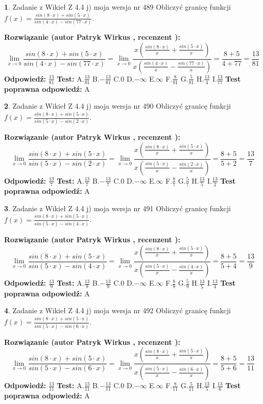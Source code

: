 \documentclass[12pt, a4paper]{article}
\theoremstyle{definition} %
\newtheorem{zad}{}
\newcommand{\zadStart}[1]{\begin{zad}#1\newline}
\newcommand{\zadStop}{\end{zad}}
\newcommand{\rozwStart}[2]{\noindent \textbf{Rozwiązanie (autor #1 , recenzent #2): }\newline}
\newcommand{\rozwStop}{\newline}
\newcommand{\odpStart}{\noindent \textbf{Odpowiedź:}\newline}
\newcommand{\odpStop}{\newline}
\newcommand{\testStart}{\noindent \textbf{Test:}\newline}
\newcommand{\testStop}{\newline}
\newcommand{\kluczStart}{\noindent \textbf{Test poprawna odpowiedź:}\newline}
\newcommand{\kluczStop}{\newline}
\begin{document}
\zadStart{Zadanie z Wikieł Z 4.4 j) moja wersja nr 489}
Obliczyć granicę funkcji $f(x)=\frac{sin(8\cdot x) +sin(5\cdot x)}{sin(4\cdot x) -sin(77\cdot x)}$.
\zadStop
\rozwStart{Patryk Wirkus}{}
$$\lim\limits_{x\to 0}\frac{sin(8\cdot x) +sin(5\cdot x)}{sin(4\cdot x) -sin(77\cdot x)}=\lim\limits_{x\to 0}\frac{x(\frac{sin(8\cdot x)}{x}+\frac{sin(5\cdot x)}{x})}{x(\frac{sin(4\cdot x)}{x}-\frac{sin(77\cdot x)}{x})}=\frac{8+5}{4+77} = \frac{13}{81}$$
\rozwStop
\odpStart
$\frac{13}{81}$
\odpStop
\testStart
A.$\frac{13}{81}$
B.$-\frac{13}{81}$
C.$0$
D.$-\infty$
E.$\infty$
F.$\frac{8}{81}$
G.$\frac{5}{81}$
H.$\frac{13}{4}$
I.$\frac{13}{77}$
\testStop
\kluczStart
A
\kluczStop



\zadStart{Zadanie z Wikieł Z 4.4 j) moja wersja nr 490}
Obliczyć granicę funkcji $f(x)=\frac{sin(8\cdot x) +sin(5\cdot x)}{sin(5\cdot x) -sin(2\cdot x)}$.
\zadStop
\rozwStart{Patryk Wirkus}{}
$$\lim\limits_{x\to 0}\frac{sin(8\cdot x) +sin(5\cdot x)}{sin(5\cdot x) -sin(2\cdot x)}=\lim\limits_{x\to 0}\frac{x(\frac{sin(8\cdot x)}{x}+\frac{sin(5\cdot x)}{x})}{x(\frac{sin(5\cdot x)}{x}-\frac{sin(2\cdot x)}{x})}=\frac{8+5}{5+2} = \frac{13}{7}$$
\rozwStop
\odpStart
$\frac{13}{7}$
\odpStop
\testStart
A.$\frac{13}{7}$
B.$-\frac{13}{7}$
C.$0$
D.$-\infty$
E.$\infty$
F.$\frac{8}{7}$
G.$\frac{5}{7}$
H.$\frac{13}{5}$
I.$\frac{13}{2}$
\testStop
\kluczStart
A
\kluczStop



\zadStart{Zadanie z Wikieł Z 4.4 j) moja wersja nr 491}
Obliczyć granicę funkcji $f(x)=\frac{sin(8\cdot x) +sin(5\cdot x)}{sin(5\cdot x) -sin(4\cdot x)}$.
\zadStop
\rozwStart{Patryk Wirkus}{}
$$\lim\limits_{x\to 0}\frac{sin(8\cdot x) +sin(5\cdot x)}{sin(5\cdot x) -sin(4\cdot x)}=\lim\limits_{x\to 0}\frac{x(\frac{sin(8\cdot x)}{x}+\frac{sin(5\cdot x)}{x})}{x(\frac{sin(5\cdot x)}{x}-\frac{sin(4\cdot x)}{x})}=\frac{8+5}{5+4} = \frac{13}{9}$$
\rozwStop
\odpStart
$\frac{13}{9}$
\odpStop
\testStart
A.$\frac{13}{9}$
B.$-\frac{13}{9}$
C.$0$
D.$-\infty$
E.$\infty$
F.$\frac{8}{9}$
G.$\frac{5}{9}$
H.$\frac{13}{5}$
I.$\frac{13}{4}$
\testStop
\kluczStart
A
\kluczStop



\zadStart{Zadanie z Wikieł Z 4.4 j) moja wersja nr 492}
Obliczyć granicę funkcji $f(x)=\frac{sin(8\cdot x) +sin(5\cdot x)}{sin(5\cdot x) -sin(6\cdot x)}$.
\zadStop
\rozwStart{Patryk Wirkus}{}
$$\lim\limits_{x\to 0}\frac{sin(8\cdot x) +sin(5\cdot x)}{sin(5\cdot x) -sin(6\cdot x)}=\lim\limits_{x\to 0}\frac{x(\frac{sin(8\cdot x)}{x}+\frac{sin(5\cdot x)}{x})}{x(\frac{sin(5\cdot x)}{x}-\frac{sin(6\cdot x)}{x})}=\frac{8+5}{5+6} = \frac{13}{11}$$
\rozwStop
\odpStart
$\frac{13}{11}$
\odpStop
\testStart
A.$\frac{13}{11}$
B.$-\frac{13}{11}$
C.$0$
D.$-\infty$
E.$\infty$
F.$\frac{8}{11}$
G.$\frac{5}{11}$
H.$\frac{13}{5}$
I.$\frac{13}{6}$
\testStop
\kluczStart
A
\kluczStop
\end{document}
